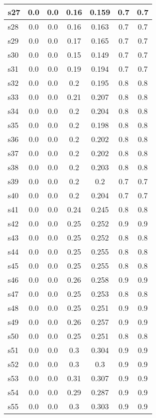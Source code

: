 \documentclass{article}
\begin{document}
\begin{tabular}{|l|c|c|c|c|c|c|}
s27 &0.0 & 0.0 & 0.16 & 0.159 & 0.7 & 0.7\\
\hline
s28 &0.0 & 0.0 & 0.16 & 0.163 & 0.7 & 0.7\\
\hline
s29 &0.0 & 0.0 & 0.17 & 0.165 & 0.7 & 0.7\\
\hline
s30 &0.0 & 0.0 & 0.15 & 0.149 & 0.7 & 0.7\\
\hline
s31 &0.0 & 0.0 & 0.19 & 0.194 & 0.7 & 0.7\\
\hline
s32 &0.0 & 0.0 & 0.2 & 0.195 & 0.8 & 0.8\\
\hline
s33 &0.0 & 0.0 & 0.21 & 0.207 & 0.8 & 0.8\\
\hline
s34 &0.0 & 0.0 & 0.2 & 0.204 & 0.8 & 0.8\\
\hline
s35 &0.0 & 0.0 & 0.2 & 0.198 & 0.8 & 0.8\\
\hline
s36 &0.0 & 0.0 & 0.2 & 0.202 & 0.8 & 0.8\\
\hline
s37 &0.0 & 0.0 & 0.2 & 0.202 & 0.8 & 0.8\\
\hline
s38 &0.0 & 0.0 & 0.2 & 0.203 & 0.8 & 0.8\\
\hline
s39 &0.0 & 0.0 & 0.2 & 0.2 & 0.7 & 0.7\\
\hline
s40 &0.0 & 0.0 & 0.2 & 0.204 & 0.7 & 0.7\\
\hline
s41 &0.0 & 0.0 & 0.24 & 0.245 & 0.8 & 0.8\\
\hline
s42 &0.0 & 0.0 & 0.25 & 0.252 & 0.9 & 0.9\\
\hline
s43 &0.0 & 0.0 & 0.25 & 0.252 & 0.8 & 0.8\\
\hline
s44 &0.0 & 0.0 & 0.25 & 0.255 & 0.8 & 0.8\\
\hline
s45 &0.0 & 0.0 & 0.25 & 0.255 & 0.8 & 0.8\\
\hline
s46 &0.0 & 0.0 & 0.26 & 0.258 & 0.9 & 0.9\\
\hline
s47 &0.0 & 0.0 & 0.25 & 0.253 & 0.8 & 0.8\\
\hline
s48 &0.0 & 0.0 & 0.25 & 0.251 & 0.9 & 0.9\\
\hline
s49 &0.0 & 0.0 & 0.26 & 0.257 & 0.9 & 0.9\\
\hline
s50 &0.0 & 0.0 & 0.25 & 0.251 & 0.8 & 0.8\\
\hline
s51 &0.0 & 0.0 & 0.3 & 0.304 & 0.9 & 0.9\\
\hline
s52 &0.0 & 0.0 & 0.3 & 0.3 & 0.9 & 0.9\\
\hline
s53 &0.0 & 0.0 & 0.31 & 0.307 & 0.9 & 0.9\\
\hline
s54 &0.0 & 0.0 & 0.29 & 0.287 & 0.9 & 0.9\\
\hline
s55 &0.0 & 0.0 & 0.3 & 0.303 & 0.9 & 0.9\\

\end{tabular}
\end{document}
